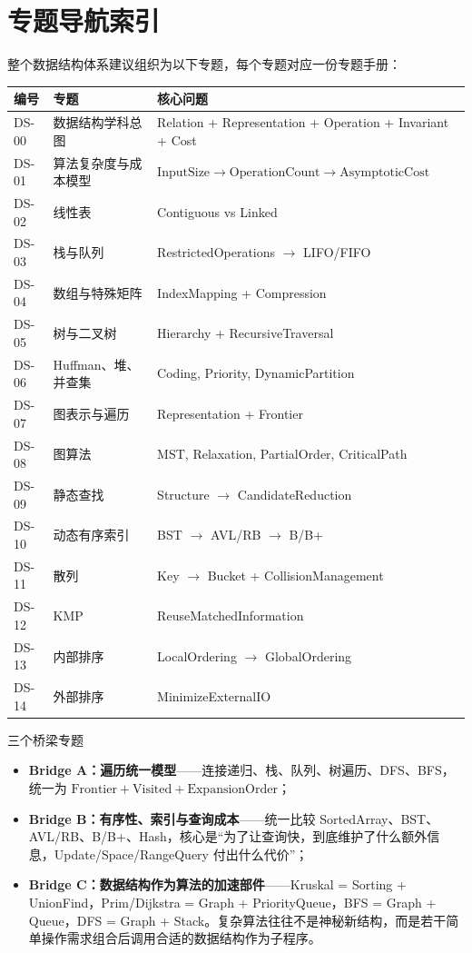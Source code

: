 \documentclass[11pt,a4paper,openany]{ctexbook}
\newcommand{\key}[1]{\textbf{\color{deep}#1}}
\begin{document}
\section{专题导航索引}

整个数据结构体系建议组织为以下专题，每个专题对应一份专题手册：

\begin{longtable}{p{1.6cm}p{4.8cm}p{\dimexpr\linewidth-7.67cm\relax}}
\toprule
\textbf{编号} & \textbf{专题} & \textbf{核心问题}\\
\midrule
DS-00 & 数据结构学科总图 & Relation + Representation + Operation + Invariant + Cost\\
\midrule
DS-01 & 算法复杂度与成本模型 & $\text{InputSize}\rightarrow\text{OperationCount}\rightarrow\text{AsymptoticCost}$\\
\midrule
DS-02 & 线性表 & Contiguous vs Linked\\
\midrule
DS-03 & 栈与队列 & RestrictedOperations $\rightarrow$ LIFO/FIFO\\
\midrule
DS-04 & 数组与特殊矩阵 & IndexMapping + Compression\\
\midrule
DS-05 & 树与二叉树 & Hierarchy + RecursiveTraversal\\
\midrule
DS-06 & Huffman、堆、并查集 & Coding, Priority, DynamicPartition\\
\midrule
DS-07 & 图表示与遍历 & Representation + Frontier\\
\midrule
DS-08 & 图算法 & MST, Relaxation, PartialOrder, CriticalPath\\
\midrule
DS-09 & 静态查找 & Structure $\rightarrow$ CandidateReduction\\
\midrule
DS-10 & 动态有序索引 & BST $\rightarrow$ AVL/RB $\rightarrow$ B/B+\\
\midrule
DS-11 & 散列 & Key $\rightarrow$ Bucket + CollisionManagement\\
\midrule
DS-12 & KMP & ReuseMatchedInformation\\
\midrule
DS-13 & 内部排序 & LocalOrdering $\rightarrow$ GlobalOrdering\\
\midrule
DS-14 & 外部排序 & MinimizeExternalIO\\
\bottomrule
\end{longtable}

\begin{corebox}{三个桥梁专题}
\begin{itemize}
  \item \key{Bridge A：遍历统一模型}——连接递归、栈、队列、树遍历、DFS、BFS，统一为 $\text{Frontier}+\text{Visited}+\text{ExpansionOrder}$；
  \item \key{Bridge B：有序性、索引与查询成本}——统一比较 SortedArray、BST、AVL/RB、B/B+、Hash，核心是“为了让查询快，到底维护了什么额外信息，Update/Space/RangeQuery 付出什么代价”；
  \item \key{Bridge C：数据结构作为算法的加速部件}——Kruskal = Sorting + UnionFind，Prim/Dijkstra = Graph + PriorityQueue，BFS = Graph + Queue，DFS = Graph + Stack。复杂算法往往不是神秘新结构，而是若干简单操作需求组合后调用合适的数据结构作为子程序。
\end{itemize}
\end{corebox}
\end{document}
